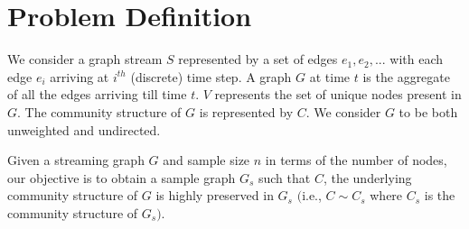 \section{Problem Definition}
\label{prob_def}

We consider a graph stream $S$ represented by a set of edges $e_1, e_2,...$ with each edge $e_i$ arriving at 
$i^{th}$ (discrete) time step. A graph $G$ at time $t$ is the aggregate of all the edges arriving till time $t$. 
$V$ represents the set of unique nodes present in  $G$. The community structure of $G$ is represented by $C$. We consider $G$ to be both unweighted and undirected. 


\begin{mydef}
Given a streaming graph $G$ and sample size $n$ in terms of the number of nodes, our objective is to obtain a sample graph $G_s$ such that $C$, the underlying community structure of $G$ is highly preserved in $G_s$  $($i.e., $C \sim C_s$ where $C_s$ is the community structure of $G_s)$. 
\end{mydef}

